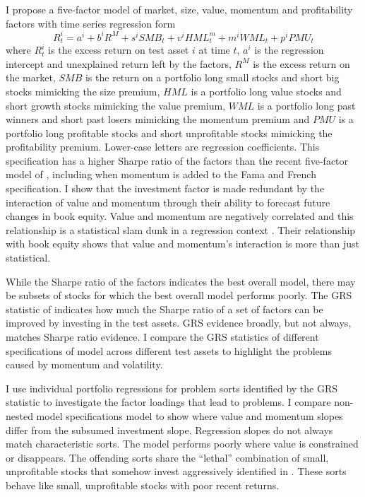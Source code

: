I propose a five-factor model of market, size, value, momentum and
profitability factors with time series regression form
\[
R_t^i = a^i+b^iR^M+s^iSMB_t+v^iHML_t^m+m^iWML_t+p^iPMU_t 
\]
where $R_t^i$ is the excess return on test asset $i$ at time $t$,
$a^i$ is the regression intercept and unexplained return left by the factors,
$R^M$ is the excess return on the market,
$SMB$ is the return on a portfolio long small stocks and short big stocks
mimicking the size premium,
$HML$ is a portfolio long value stocks and short growth stocks mimicking the
value premium,
$WML$ is a portfolio long past winners and short past losers mimicking the
momentum premium and
$PMU$ is a portfolio long profitable stocks and short unprofitable stocks
mimicking the profitability premium.
Lower-case letters are regression coefficients.
This specification has a higher Sharpe ratio of the factors
than the recent five-factor model of \textcite{fama2015five}, including when
momentum is added to the Fama and French specification.
I show that the investment factor is made redundant by
the interaction of value and momentum through their ability to forecast
future changes in book equity.
Value and momentum are negatively correlated and this relationship is a
statistical slam dunk in a regression context 
\parencite{asness1997interaction, fama2015incremental}.
Their relationship with book equity shows that value and
momentum's interaction is more than just statistical.

While the Sharpe ratio of the factors indicates the best overall model,
there may be subsets of stocks for which the best overall model
performs poorly.
The GRS statistic of \textcite{gibbons1989test} indicates how much the Sharpe
ratio of a set of factors can be improved by investing in the test assets.
GRS evidence broadly, but not always, matches Sharpe ratio evidence.
I compare the GRS statistics of different specifications of model across
different test assets to highlight the problems caused by momentum and
volatility.

I use individual portfolio regressions for problem sorts identified by the GRS
statistic to investigate the factor loadings that lead to problems. I compare
non-nested model specifications model to show where value and momentum slopes
differ from the subsumed investment slope. Regression slopes do not always
match characteristic sorts. The model performs poorly where value is
constrained or disappears. The offending sorts share the ``lethal”
combination of small, unprofitable stocks that somehow invest aggressively
identified in \textcite{fama2015five, fama2016dissecting}. These sorts behave
like small, unprofitable stocks with poor recent returns.
